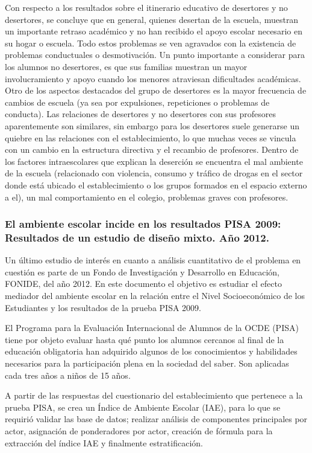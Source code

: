 Con respecto a los resultados sobre el itinerario educativo de desertores y no desertores, se concluye que en general, quienes desertan de la escuela, muestran un importante retraso académico y no han recibido el apoyo escolar necesario en su hogar o escuela. Todo estos problemas se ven agravados con la existencia de problemas conductuales o desmotivación. Un punto importante a considerar para los alumnos no desertores, es que sus familias muestran un mayor involucramiento y apoyo cuando los menores atraviesan dificultades académicas. Otro de los aspectos destacados del grupo de desertores es la mayor frecuencia de cambios de escuela (ya sea por expulsiones, repeticiones o problemas de conducta). Las relaciones de desertores y no desertores con sus profesores aparentemente son similares, sin embargo para los desertores suele generarse un quiebre en las relaciones con el establecimiento, lo que muchas veces se vincula con un cambio en la estructura directiva y el recambio de profesores. 
Dentro de los factores intraescolares que explican la deserción se encuentra el mal ambiente de la escuela (relacionado con violencia, consumo y tráfico de drogas en el sector donde está ubicado el establecimiento o los grupos formados en el espacio externo a el), un mal comportamiento en el colegio,  problemas graves con profesores. 

\subsubsection{El ambiente escolar incide en los resultados PISA 2009: Resultados de un estudio de diseño mixto. Año 2012.}
Un último estudio de interés en cuanto a análisis cuantitativo de el problema en cuestión es parte de un Fondo de Investigación y Desarrollo en Educación, FONIDE, del año 2012. En este documento el objetivo es estudiar el efecto mediador del ambiente escolar en la relación entre el Nivel Socioeconómico de los Estudiantes y los resultados de la prueba PISA 2009. 

El Programa para la Evaluación Internacional de Alumnos de la OCDE (PISA) tiene por objeto evaluar hasta qué punto los alumnos cercanos al final de la educación obligatoria han adquirido algunos de los conocimientos y habilidades necesarios para la participación plena en la sociedad del saber. Son aplicadas cada tres años a niños de 15 años.

A partir de las respuestas del cuestionario del establecimiento que pertenece a la prueba PISA, se crea un Índice de Ambiente Escolar (IAE), para lo que se requirió validar las base de datos; realizar análisis de componentes principales por actor, asignación de ponderadores por actor, creación de fórmula para la extracción del índice IAE y finalmente estratificación. 

